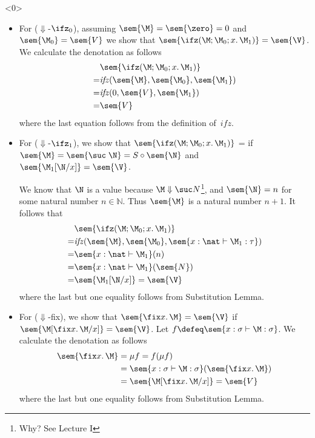 \begin{frame}<0>
\begin{itemize}
  \item For ($\Downarrow$-$\ifz_0$), assuming $\sem{\M}=\sem{\zero} = 0$
    and $\sem{\M_0} = \sem{V}$ we show that
    $\sem{\ifz(\M; \M_0; x.\, \M_1)} = \sem{\V}$. We calculate the
    denotation as follows
    \begin{align*}
      & \sem{\ifz(\M;\M_0;x.\,\M_1)} \\
         = &\mathit{ifz}(\sem{\M}, \sem{\M_0}, \sem{\M_1}) \\
         = &\mathit{ifz}(0, \sem{V}, \sem{\M_1}) \\
         = &\sem{V}
    \end{align*}
    where the last equation follows from the definition of~$\mathit{ifz}$. 
  \item For ($\Downarrow$-$\ifz_1$), we show that $\sem{\ifz(\M;\M_0;
      x.\,\M_1)}$ =  if $\sem{\M} = \sem{\suc\;\N} = S \circ \sem{\N}$
    and $\sem{\M_1[\N/x]} = \sem{\V}$.

  We know that $\N$ is a value because $\M\Downarrow\suc N$\footnote{
    Why? See Lecture I}, and $\sem{\N} = n$ for some natural number $n
  \in \mathbb{N}$.  Thus $\sem{\M}$ is a natural number $n + 1$. It follows
  that 
  \begin{align*}
       & \sem{\ifz(\M; \M_0; x.\,\M_1)} \\
     = & \mathit{ifz}(\sem{\M}, \sem{\M_0}, \sem{x : \nat\vdash \M_1 :
      \tau}) \\
     = & \sem{x : \nat \vdash \M_1}(n) \\
     = & \sem{x : \nat \vdash \M_1}(\sem{N}) \\
     = &\sem{\M_1[\N/x]} = \sem{\V}
  \end{align*}
  where the last but one equality follows from Substitution Lemma.

  \item For ($\Downarrow$-fix), we show that $\sem{\fix x.\,\M} = \sem{\V}$ if
    $\sem{\M[\fix x.\,\M/x]} = \sem{\V}$.  Let $f \defeq \sem{x : \sigma \vdash
      \M : \sigma}$.  We
    calculate the denotation as follows
    \begin{align*}
      \sem{\fix x.\,\M}
      & = \mu f = f(\mu f) \\
      & = \sem{x : \sigma \vdash \M : \sigma}(\sem{\fix x.\, \M}) \\
      & = \sem{\M[\fix x.\, \M/x]} = \sem{V}
    \end{align*}
    where the last but one equality follows from Substitution Lemma.
\end{itemize}
\end{frame}

